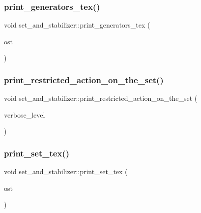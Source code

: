 \subsubsection{\texorpdfstring{print\+\_\+generators\+\_\+tex()}{print\_generators\_tex()}}
{\footnotesize\ttfamily void set\+\_\+and\+\_\+stabilizer\+::print\+\_\+generators\+\_\+tex (\begin{DoxyParamCaption}\item[{ostream \&}]{ost }\end{DoxyParamCaption})}

\mbox{\label{classset__and__stabilizer_aa802ca2f1a88616a36ca30562019c6f2}} 
\subsubsection{\texorpdfstring{print\+\_\+restricted\+\_\+action\+\_\+on\+\_\+the\+\_\+set()}{print\_restricted\_action\_on\_the\_set()}}
{\footnotesize\ttfamily void set\+\_\+and\+\_\+stabilizer\+::print\+\_\+restricted\+\_\+action\+\_\+on\+\_\+the\+\_\+set (\begin{DoxyParamCaption}\item[{\mbox{\hyperlink{galois_8h_a09fddde158a3a20bd2dcadb609de11dc}{I\+NT}}}]{verbose\+\_\+level }\end{DoxyParamCaption})}

\mbox{\label{classset__and__stabilizer_a691a961365c213993a7f9f4b899457d9}} 
\subsubsection{\texorpdfstring{print\+\_\+set\+\_\+tex()}{print\_set\_tex()}}
{\footnotesize\ttfamily void set\+\_\+and\+\_\+stabilizer\+::print\+\_\+set\+\_\+tex (\begin{DoxyParamCaption}\item[{ostream \&}]{ost }\end{DoxyParamCaption})}

